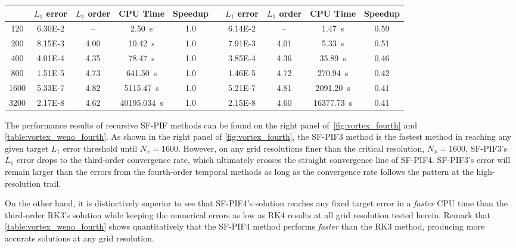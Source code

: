 \begin{table}
\begin{adjustbox}{width=\textwidth}
\begin{tabular}{@{}ccccclcccc@{}}
            \cmidrule(lr){2-5} \cmidrule(l){7-10}
            & \(L_{1}\) error & \(L_{1}\) order & CPU Time & Speedup &  &
            \(L_{1}\) error & \(L_{1}\) order & CPU Time & Speedup \\ \midrule
            120  & \num{6.30E-2} & \--- & \SI{2.50}{\second}       & 1.0 &  & \num{6.14E-2} & \--- & \SI{1.47}{\second}     & 0.59 \\
            200  & \num{8.15E-3} & 4.00 & \SI{10.42}{\second}      & 1.0 &  & \num{7.91E-3} & 4.01 & \SI{5.33}{\second}     & 0.51 \\
            400  & \num{4.01E-4} & 4.35 & \SI{78.47}{\second}      & 1.0 &  & \num{3.85E-4} & 4.36 & \SI{35.89}{\second}    & 0.46 \\
            800  & \num{1.51E-5} & 4.73 & \SI{641.50}{\second}     & 1.0 &  & \num{1.46E-5} & 4.72 & \SI{270.94}{\second}   & 0.42 \\
            1600 & \num{5.33E-7} & 4.82 & \SI{5115.47}{\second}    & 1.0 &  & \num{5.21E-7} & 4.81 & \SI{2091.20}{\second}  & 0.41 \\
            3200 & \num{2.17E-8} & 4.62 & \SI{40195.034}{\second}  & 1.0 &  & \num{2.15E-8} & 4.60 & \SI{16377.73}{\second} & 0.41 \\
        \end{tabular}
    \end{adjustbox}
\end{table}

The performance results of recursive SF-PIF methods can be found
on the right panel of~\cref{fig:vortex_fourth} and \cref{table:vortex_weno_fourth}.
As shown in the right panel of \cref{fig:vortex_fourth},
the SF-PIF3 method is the fastest method in reaching any given target \( L_{1} \) error threshold until \( N_{x} = 1600 \).
However, on any grid resolutions finer than the critical resolution, \( N_{x} = 1600 \),
SF-PIF3's \( L_{1} \) error drops to the third-order convergence rate,
which ultimately crosses the straight convergence line of SF-PIF4.
SF-PIF3's error will remain larger than the errors from the fourth-order temporal methods
as long as the convergence rate follows the pattern at the high-resolution trail.

On the other hand, it is distinctively superior to see that SF-PIF4's solution
reaches any fixed target error in a \textit{faster} CPU time than the third-order RK3's solution
while keeping the numerical errors as low as RK4 results at all grid resolution tested herein.
Remark that \cref{table:vortex_weno_fourth} shows quantitatively that
the SF-PIF4 method performs \textit{faster} than the RK3 method,
producing more accurate solutions at any grid resolution.








